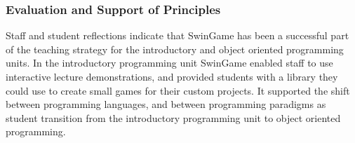 
\subsubsection{Evaluation and Support of Principles} %
\label{ssub:evaluation_and_support_of_principles}

Staff and student reflections indicate that SwinGame has been a successful part of the teaching strategy for the introductory and object oriented programming units. In the introductory programming unit SwinGame enabled staff to use interactive lecture demonstrations, and provided students with a library they could use to create small games for their custom projects. It supported the shift between programming languages, and between programming paradigms as student transition from the introductory programming unit to object oriented programming.

